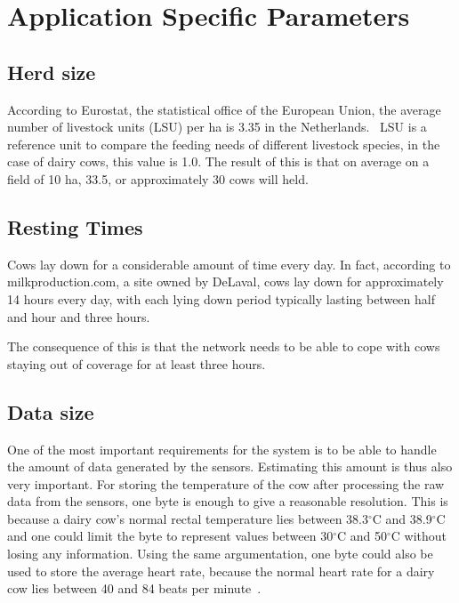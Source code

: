 \documentclass[conference]{IEEEtran}
\begin{document}
\section{Application Specific Parameters} \label{sec:cons}

\subsection{Herd size}

According to Eurostat, the statistical office of the European Union, the
average number of livestock units (LSU) per ha is 3.35 in the
Netherlands.~\cite{eurostat} LSU is a reference unit to compare the feeding
needs of different livestock species, in the case of dairy cows, this value is
1.0.  The result of this is that on average on a field of 10 ha, 33.5, or
approximately 30 cows will held.

\subsection{Resting Times}

Cows lay down for a considerable amount of time every day. In fact, according
to milkproduction.com, a site owned by DeLaval, cows lay down for approximately
14 hours every day, with each lying down period typically lasting between half
and hour and three hours.~\cite{milkproduction}

The consequence of this is that the network needs to be able to cope with cows
staying out of coverage for at least three hours. 

\subsection{Data size}

One of the most important requirements for the system is to be able to handle
the amount of data generated by the sensors. Estimating this amount is thus
also very important. For storing the temperature of the cow after processing
the raw data from the sensors, one byte is enough to give a reasonable
resolution. This is because a dairy cow’s normal rectal temperature lies
between 38.3$^\circ$C and 38.9$^\circ$C~\cite{wikibov} and one could limit the
byte to represent values between 30$^\circ$C and 50$^\circ$C without losing any
information.  Using the same argumentation, one byte could also be used to
store the average heart rate, because the normal heart rate for a dairy cow
lies between 40 and 84 beats per minute~\cite{wikibov}.
\end{document}

